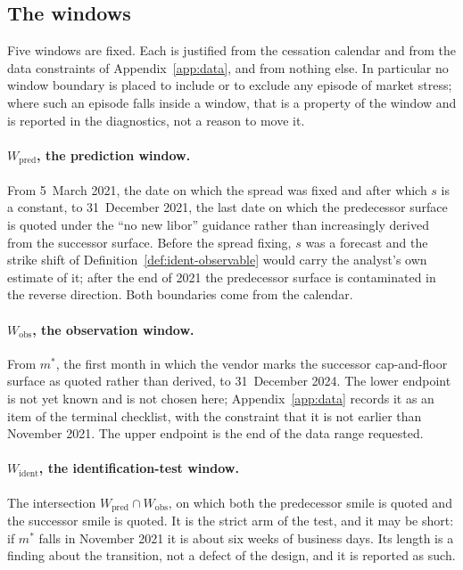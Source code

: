 \documentclass[../../../main.tex]{subfiles}
\begin{document}
\subsection{The windows}

Five windows are fixed. Each is justified from the cessation calendar and from the data constraints of Appendix~\ref{app:data}, and from nothing else. In particular no window boundary is placed to include or to exclude any episode of market stress; where such an episode falls inside a window, that is a property of the window and is reported in the diagnostics, not a reason to move it.

\paragraph{$W_{\mathrm{pred}}$, the prediction window.} From 5~March 2021, the date on which the spread was fixed and after which $s$ is a constant, to 31~December 2021, the last date on which the predecessor surface is quoted under the ``no new \gls{libor}'' guidance rather than increasingly derived from the successor surface. Before the spread fixing, $s$ was a forecast and the strike shift of Definition~\ref{def:ident-observable} would carry the analyst's own estimate of it; after the end of 2021 the predecessor surface is contaminated in the reverse direction. Both boundaries come from the calendar.

\paragraph{$W_{\mathrm{obs}}$, the observation window.} From $m^*$, the first month in which the vendor marks the successor cap-and-floor surface as quoted rather than derived, to 31~December 2024. The lower endpoint is not yet known and is not chosen here; Appendix~\ref{app:data} records it as an item of the terminal checklist, with the constraint that it is not earlier than November 2021. The upper endpoint is the end of the data range requested.

\paragraph{$W_{\mathrm{ident}}$, the identification-test window.} The intersection $W_{\mathrm{pred}}\cap W_{\mathrm{obs}}$, on which both the predecessor smile is quoted and the successor smile is quoted. It is the strict arm of the test, and it may be short: if $m^*$ falls in November 2021 it is about six weeks of business days. Its length is a finding about the transition, not a defect of the design, and it is reported as such.
\end{document}
